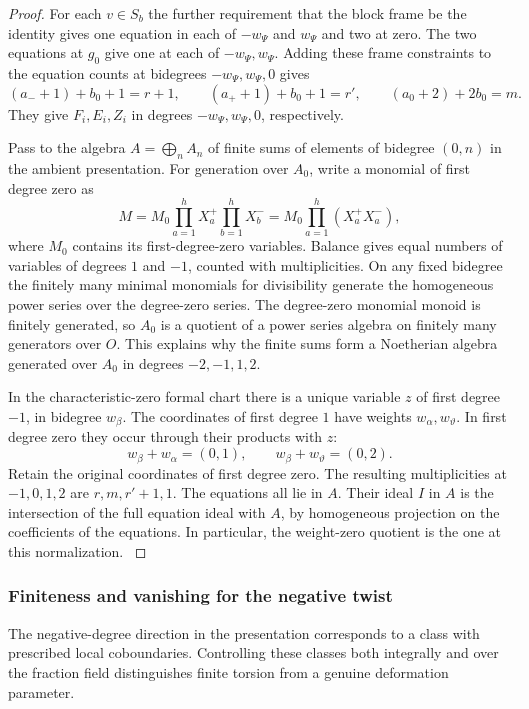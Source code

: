 \begin{proof}
For each \(v\in S_b\) the further requirement that the block
frame be the identity gives one equation in each of \(-w_\Psi\)
and \(w_\Psi\) and two at zero. The two equations at \(g_0\)
give one at each of \(-w_\Psi,w_\Psi\).
Adding these frame constraints to the equation counts at bidegrees \(-w_\Psi,w_\Psi,0\) gives
\[
   (a_-+1)+b_0+1=r+1,\qquad
   (a_++1)+b_0+1=r',\qquad
   (a_0+2)+2b_0=m .
\]
They give \(F_i,E_i,Z_i\) in degrees \(-w_\Psi,w_\Psi,0\),
respectively. \label{cor:ordinary-symplectic-cohomology-4}

Pass to the algebra \(A=\bigoplus_n A_n\) of finite sums of
elements of bidegree \((0,n)\) in the ambient presentation.
For generation over \(A_0\), write a monomial of first degree zero as
\[
 M=M_0\prod_{a=1}^h X_a^+\prod_{b=1}^h X_b^-
   =M_0\prod_{a=1}^h(X_a^+X_a^-),
\]
where \(M_0\) contains its first-degree-zero variables. Balance gives equal numbers of variables of degrees \(1\) and \(-1\), counted with multiplicities. On any fixed bidegree the finitely many minimal
monomials for divisibility generate the homogeneous power
series over the degree-zero series. The degree-zero monomial
monoid is finitely generated, so \(A_0\) is a quotient of a
power series algebra on finitely many generators over \(O\).
This explains why the
finite sums form a Noetherian algebra generated over \(A_0\)
in degrees \(-2,-1,1,2\).

In the characteristic-zero formal
chart there is a unique variable \(z\) of first degree \(-1\),
in bidegree \(w_\beta\). The coordinates of first degree \(1\) have weights
\(w_\alpha,w_\vartheta\). In first degree zero they occur
through their products with \(z\):
\[
      w_\beta+w_\alpha=(0,1),\qquad
      w_\beta+w_\vartheta=(0,2).
\]
Retain the original coordinates of first degree zero. The resulting multiplicities
at \(-1,0,1,2\) are \(r,m,r'+1,1\). The equations all lie
in \(A\). Their ideal \(I\) in \(A\) is the intersection of
the full equation ideal with \(A\), by homogeneous projection
on the coefficients of the equations. In particular, the
weight-zero quotient is the one at this normalization.
\label{cor:ordinary-symplectic-cohomology-5}

\end{proof}

\subsubsection{Finiteness and vanishing for the negative twist}

The negative-degree direction in the presentation corresponds to a class with prescribed local coboundaries. Controlling these classes both integrally and over the fraction field distinguishes finite torsion from a genuine deformation parameter.

